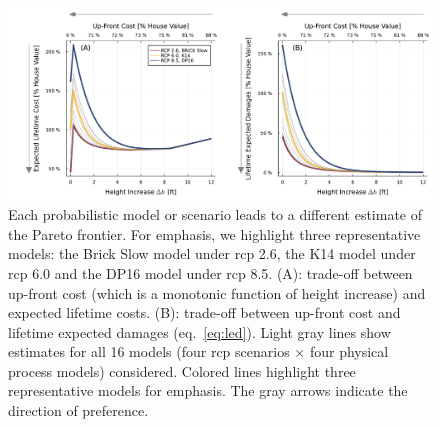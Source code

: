 \documentclass{agujournal2019}
\begin{document}
\begin{figure}
  \centering
  \includegraphics[width=\textwidth]{tradeoffs-by-rcp}
  \caption{
    Each probabilistic model or scenario leads to a different estimate of the Pareto frontier.
    For emphasis, we highlight three representative models: the Brick Slow model \protect\cite{wong_brick0.2:2017} under \gls{rcp} 2.6, the K14 \protect\cite{kopp_probabilistic:2014} model under \gls{rcp} 6.0 and the DP16 model \protect\cite{deconto_antarctica:2016,kopp_evolving:2017} under \gls{rcp} 8.5.
    (A): trade-off between up-front cost (which is a monotonic function of height increase) and expected lifetime costs.
    (B): trade-off between up-front cost and lifetime expected damages (eq.~\ref{eq:led}).
    Light gray lines show estimates for all 16 models (four \gls{rcp} scenarios $\times$ four physical process models) considered.
    Colored lines highlight three representative models for emphasis.
    The gray arrows indicate the direction of preference.
  }\label{fig:tradeoffs-by-rcp}
\end{figure}
\end{document}
